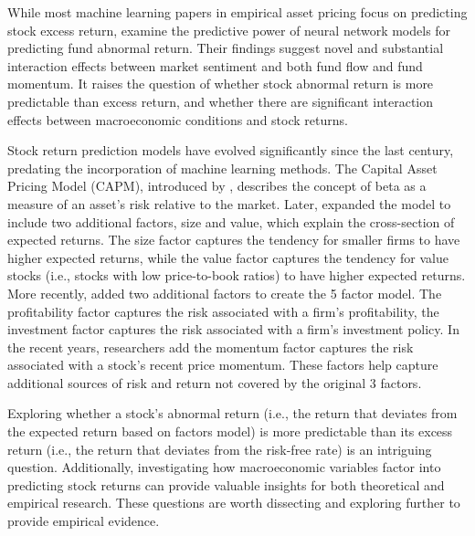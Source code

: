 While most machine learning papers in empirical asset pricing focus on predicting stock excess return, \citet*{kaniel2022machine} examine the predictive power of neural network models for predicting fund abnormal return. Their findings suggest novel and substantial interaction effects between market sentiment and both fund flow and fund momentum. It raises the question of whether stock abnormal return is more predictable than excess return, and whether there are significant interaction effects between macroeconomic conditions and stock returns.

Stock return prediction models have evolved significantly since the last century, predating the incorporation of machine learning methods. The Capital Asset Pricing Model (CAPM), introduced by \citet*{sharpe1964capital}, describes the concept of beta as a measure of an asset's risk relative to the market. Later, \citet*{fama1993common} expanded the model to include two additional factors, size and value, which explain the cross-section of expected returns. The size factor captures the tendency for smaller firms to have higher expected returns, while the value factor captures the tendency for value stocks (i.e., stocks with low price-to-book ratios) to have higher expected returns. More recently, \citet*{fama2015five} added two additional factors to create the 5 factor model. The profitability factor captures the risk associated with a firm's profitability, the investment factor captures the risk associated with a firm's investment policy. In the recent years, researchers add the momentum factor captures the risk associated with a stock's recent price momentum. These factors help capture additional sources of risk and return not covered by the original 3 factors.

Exploring whether a stock's abnormal return (i.e., the return that deviates from the expected return based on factors model) is more predictable than its excess return (i.e., the return that deviates from the risk-free rate) is an intriguing question. Additionally, investigating how macroeconomic variables factor into predicting stock returns can provide valuable insights for both theoretical and empirical research. These questions are worth dissecting and exploring further to provide empirical evidence.